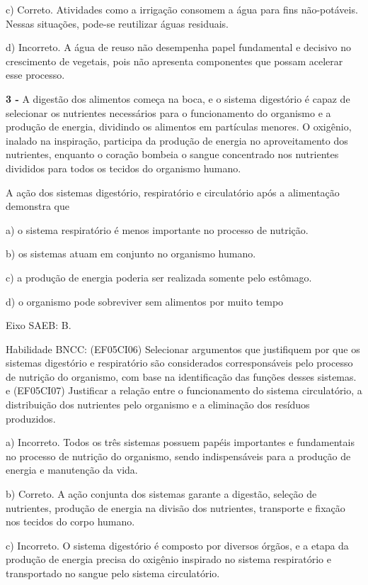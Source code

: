 c) Correto. Atividades como a irrigação consomem a água para fins
não-potáveis. Nessas situações, pode-se reutilizar águas residuais.

d) Incorreto. A água de reuso não desempenha papel fundamental e
decisivo no crescimento de vegetais, pois não apresenta componentes que
possam acelerar esse processo.

\textbf{3 -} A digestão dos alimentos começa na boca, e o sistema
digestório é capaz de selecionar os nutrientes necessários para o
funcionamento do organismo e a produção de energia, dividindo os
alimentos em partículas menores. O oxigênio, inalado na inspiração,
participa da produção de energia no aproveitamento dos nutrientes,
enquanto o coração bombeia o sangue concentrado nos nutrientes divididos
para todos os tecidos do organismo humano.

A ação dos sistemas digestório, respiratório e circulatório após a
alimentação demonstra que

a) o sistema respiratório é menos importante no processo de nutrição.

b) os sistemas atuam em conjunto no organismo humano.

c) a produção de energia poderia ser realizada somente pelo estômago.

d) o organismo pode sobreviver sem alimentos por muito tempo

Eixo SAEB: B.

Habilidade BNCC: (EF05CI06) Selecionar argumentos que justifiquem por
que os sistemas digestório e respiratório são considerados
corresponsáveis pelo processo de nutrição do organismo, com base na
identificação das funções desses sistemas. e (EF05CI07) Justificar a
relação entre o funcionamento do sistema circulatório, a distribuição
dos nutrientes pelo organismo e a eliminação dos resíduos produzidos.

a) Incorreto. Todos os três sistemas possuem papéis importantes e
fundamentais no processo de nutrição do organismo, sendo indispensáveis
para a produção de energia e manutenção da vida.

b) Correto. A ação conjunta dos sistemas garante a digestão, seleção de
nutrientes, produção de energia na divisão dos nutrientes, transporte e
fixação nos tecidos do corpo humano.

c) Incorreto. O sistema digestório é composto por diversos órgãos, e a
etapa da produção de energia precisa do oxigênio inspirado no sistema
respiratório e transportado no sangue pelo sistema circulatório.

